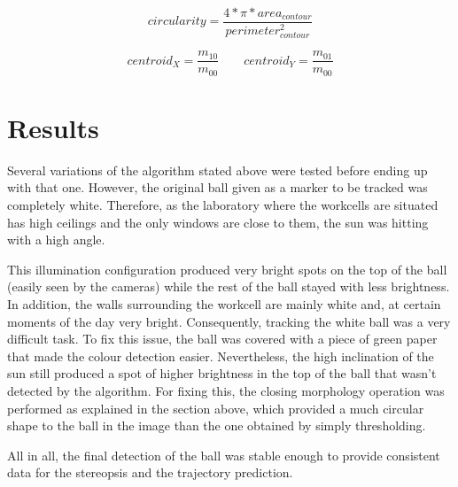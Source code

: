 \begin{equation}
circularity=\frac{4*\pi*area_{contour}}{perimeter_{contour}^{2}}
\label{eq:circularity}
\end{equation}

\begin{equation}
centroid_{X}=\frac{m_{10}}{m_{00}} \qquad centroid_{Y}=\frac{m_{01}}{m_{00}}
\label{eq:centroids}
\end{equation}

\section{Results}
Several variations of the algorithm stated above were tested before ending up with that one. However, the original ball given as a marker to be tracked was completely white. Therefore, as the laboratory where the workcells are situated has high ceilings and the only windows are close to them, the sun was hitting with a high angle. 

This illumination configuration produced very bright spots on the top of the ball (easily seen by the cameras) while the rest of the ball stayed with less brightness. In addition, the walls surrounding the workcell are mainly white and, at certain moments of the day very bright. Consequently, tracking the white ball was a very difficult task. To fix this issue, the ball was covered with a piece of green paper that made the colour detection easier. Nevertheless, the high inclination of the sun still produced a spot of higher brightness in the top of the ball that wasn't detected by the algorithm. For fixing this, the closing morphology operation was performed as explained in the section above, which provided a much circular shape to the ball in the image than the one obtained by simply thresholding.

All in all, the final detection of the ball was stable enough to provide consistent data for the stereopsis and the trajectory prediction.

